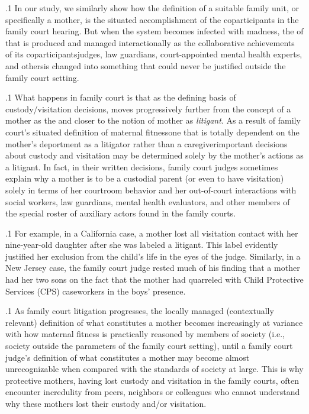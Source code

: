 \documentclass[11pt, twoside]{article}
\begin{document}
{\p.1{%
In our study, we similarly show how the definition of a suitable family unit, or specifically a  mother, is the situated accomplishment
of the coparticipants in the family court hearing. But when the system
becomes infected with madness, the  of
 that is produced and managed interactionally as the
collaborative achievements of its coparticipants\mdash{}judges, law guardians,
court-appointed mental health experts, and others\mdash{}is changed into
something that could never be justified outside the family court setting.
}%

\p.1{%
What happens in family court is that  as the defining
basis of custody/visitation decisions, moves progressively further from
the concept of a mother as the  and closer to the notion of
mother as \textit{litigant}. As a result of family court’s situated definition of maternal
fitness\mdash{}one that is totally dependent on the mother’s deportment
as a litigator rather than a caregiver\mdash{}important decisions about custody and visitation may be determined solely by the mother’s actions as
a litigant. In fact, in their written decisions, family court judges sometimes explain why a mother is  to be a custodial parent (or even to
have visitation) solely in terms of her courtroom behavior
and her out-of-court interactions with social workers, law guardians, mental health
evaluators, and other members of the special roster of auxiliary actors
found in the family courts.
}%

\p.1{%
For example, in a California case, a mother lost all visitation contact
with her nine-year-old daughter after she was labeled a  litigant. This label evidently justified her exclusion from the child’s life in
the eyes of the judge. Similarly, in a New Jersey case, the family court
judge rested much of his finding that a mother had  her two
sons on the fact that the mother had quarreled with Child Protective
Services (CPS) caseworkers in the boys’ presence.
}%

\p.1{%
As family court litigation progresses, the locally managed (contextually relevant) definition of what constitutes a  mother becomes
increasingly at variance with how maternal fitness is practically reasoned
by members of society (i.e., society outside the parameters of the family
court setting), until a family court judge’s definition of what constitutes
a  mother may become almost unrecognizable when compared
with the standards of society at large. This is why protective mothers,
having lost custody and visitation in the family courts, often encounter
incredulity from peers, neighbors or colleagues who cannot understand
why these  mothers lost their custody and/or visitation.
}%

}
\end{document}

